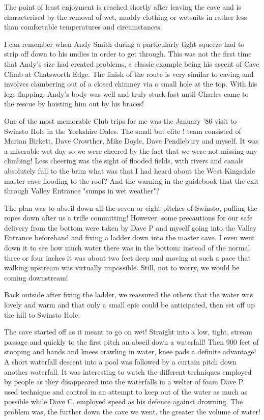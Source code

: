 \documentclass[a5paper,openany,font 10pt]{scrbook}
\begin{document}
The point of least enjoyment is reached shortly after
leaving the cave and is characterised by the removal of wet,
muddy clothing or wetsuits in rather less than comfortable
temperatures and circumstances.

I can remember when Andy Smith during a particularly tight
squeeze had to strip off down to his undies in order to get
through. This was not the first time that Andy's size had created
problems, a classic example being his ascent of  Cave Climb  at
Chatsworth Edge. The finish of the route is very similar to
caving and involves clambering out of a closed chimney via a
small hole at the top. With his legs flapping, Andy's body was
well and truly stuck fast until Charles came to the rescue by
hoisting him out by his braces!

One of the most memorable Club trips for me was the January
'86 visit to Swinsto Hole in the Yorkshire Dales. The small but
elite !  team consisted of Marian Birkett, Dave Crowther, Mike
Doyle, Dave Pendlebury and myself. It was a miserable wet day so
we were cheered by the fact that we were not missing any
climbing! Less cheering was the sight of flooded fields, with
rivers and canals absolutely full to the brim   what was that I
had heard about the West Kingsdale master cave flooding to the
roof? And the warning in the guidebook that the exit through
Valley Entrance "sumps in wet weather"?

The plan was to abseil down all the seven or eight pitches
of Swinsto, pulling the ropes down after us   a trifle
committing! However, some precautions for our safe delivery from
the bottom were taken by Dave P and myself going into the Valley
Entrance beforehand and fixing a ladder down into the master
cave. I even went down it to see how much water there was in the
bottom: instead of the normal three or four inches it was about
two feet deep and moving at such a pace that walking upstream was
virtually impossible. Still, not to worry, we would be coming
downstream!

Back outside after fixing the ladder, we reassured the
others that the water was lovely and warm and that only a small
epic could be anticipated, then set off up the hill to Swinsto
Hole.

The cave started off as it meant to go on   wet! Straight
into a low, tight, stream passage and quickly to the first pitch
  an abseil down a waterfall! Then 900 feet of stooping and
hands and knees crawling in water, knee pads a definite
advantage! A short waterfall descent into a pool was followed by
a curtain pitch down another waterfall. It was interesting to
watch the different techniques employed by people as they
disappeared into the waterfalls in a welter of foam   Dave P.
used technique and control in an attempt to keep out of the water
as much as possible while Dave C. employed speed as his defence
against drowning. The problem was, the further down the cave we
went, the greater the volume of water!
\end{document}
